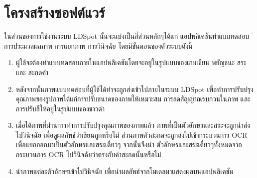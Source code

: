 \documentclass[12pt,oneside,openright,a4paper]{cpe-thai-project}
\begin{document}
\section{โครงสร้างซอฟต์แวร์}
ในส่วนของการใช้งานระบบ LDSpot นั้นจะแบ่งเป็นสี่ส่วนหลักๆได้แก่ แอปพลิเคชันทำแบบทดสอบ การประมวลผลภาพ การแยกภาพ การวินิจฉัย โดยมีขั้นตอนของตัวระบบดังนี้
\begin{enumerate}
  \item ผู้ใช้จะต้องทำแบบทดสอบภายในแอปพลิเคชันโดยจะอยู่ในรูปแบบของเกมเขียน พยัญชนะ สระ และ สะกดคำ
  \item หลังจากนั้นภาพแบบทดสอบที่ผู้ใช้ได้ทำจะถูกส่งเข้าไปภายในระบบ LDSpot เพื่อทำการปรับปรุงคุณภาพของรูปภาพได้แก่การปรับขนาดของภาพให้เหมาะสม การลดสัญญาณรบกวนในภาพ และการปรับสีให้อยู่ในรูปแบบของขาวดำ
  \item เมื่อได้ภาพที่ผ่านการทำการปรับปรุงคุณภาพของภาพแล้ว ภาพที่เป็นตัวอักษรและสระจะถูกนำส่งไปวินิจฉัย เพื่อดูผลลัพธ์ว่าเขียนถูกหรือไม่ ส่วนภาพตัวสะกดจะถูกส่งไปเข้ากระบวนการ OCR เพื่อแยกออกมาเป็นตัวอักษรและสระเดี่ยวๆ จากนั้นจึงนำ ตัวอักษรและสระเดี่ยวๆทั้งหมดจากกระบวนการ OCR ไปวินิจฉัยว่าตรงกับคำสะกดนั้นหรือไม่
  \item นำภาพแต่ละตัวอักษรเข้าไปวินิจฉัย เพื่อนำผลลัพธ์จากโมเดลมาแสดงผลบนแอปพลิเคชัน
\end{enumerate}
\end{document}
